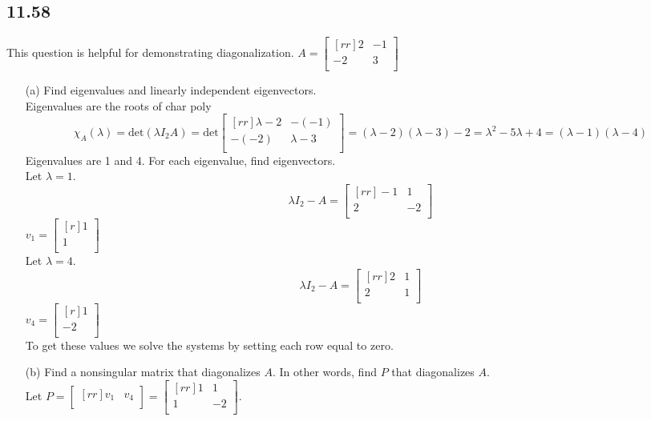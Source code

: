 \documentclass{report}
\theoremstyle{plain}
\theoremstyle{definition}
\theoremstyle{plain}
\begin{document}
\subsection{11.58}
This question is helpful for demonstrating diagonalization.
$A=\begin{bmatrix}[rr]2&-1\\-2&3\\\end{bmatrix}$\\
\begin{enumerate}
\item[(a)]Find eigenvalues and linearly independent eigenvectors.\\
Eigenvalues are the roots of char poly
\[ \chi_A(\lambda)=\mathrm{det}(\lambda I_2A) = \mathrm{det}\begin{bmatrix}[rr]\lambda -2 & -(-1)\\-(-2)&\lambda - 3\\\end{bmatrix} = (\lambda - 2)(\lambda - 3)-2 = \lambda^2-5\lambda + 4=(\lambda - 1)(\lambda - 4) \]
Eigenvalues are 1 and 4. For each eigenvalue, find eigenvectors.\\
Let $\lambda=1$. 
\[ \lambda I_2-A=\begin{bmatrix}[rr]-1&1\\2&-2\\\end{bmatrix} \]
$v_1 = \begin{bmatrix}[r]1\\1\\\end{bmatrix}$\\
Let $\lambda = 4$.
\[ \lambda I_2-A=\begin{bmatrix}[rr]2&1\\2&1\\\end{bmatrix} \]
$v_4 = \begin{bmatrix}[r]1\\-2\\\end{bmatrix}$\\
To get these values we solve the systems by setting each row equal to zero.
\item[(b)]Find a nonsingular matrix that diagonalizes $A$. In other words, find $P$ that diagonalizes $A$.\\
Let $P=\begin{bmatrix}[rr]v_1&v_4\\\end{bmatrix} = \begin{bmatrix}[rr]1&1\\1&-2\\\end{bmatrix}$.\\

\end{enumerate}
\end{document}
